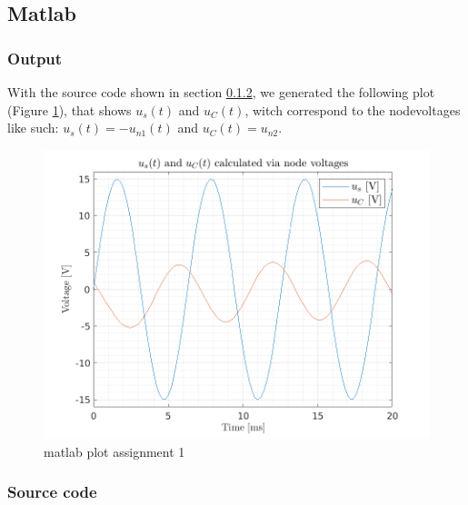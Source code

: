 \documentclass[a4paper]{article}
\begin{document}
\subsection{Matlab} \label{sec:matlab}
\subsubsection{Output}
With the source code shown in section \ref{sec:source}, we generated the following plot (Figure
\ref{fig:matl_ass1}),
that shows $u_{s}(t)$ and $u_{C}(t)$, witch correspond to the nodevoltages like such: $u_{s}(t) = -u_{n1}(t)$
and $u_{C}(t) = u_{n2}$.
\begin{figure}[ht]
  \includegraphics{./Figures/ue8_ass_1_plot.png}
  \caption{matlab plot assignment 1}
  \label{fig:matl_ass1}
\end{figure}

\subsubsection{Source code} \label{sec:source}
  
\end{document}
